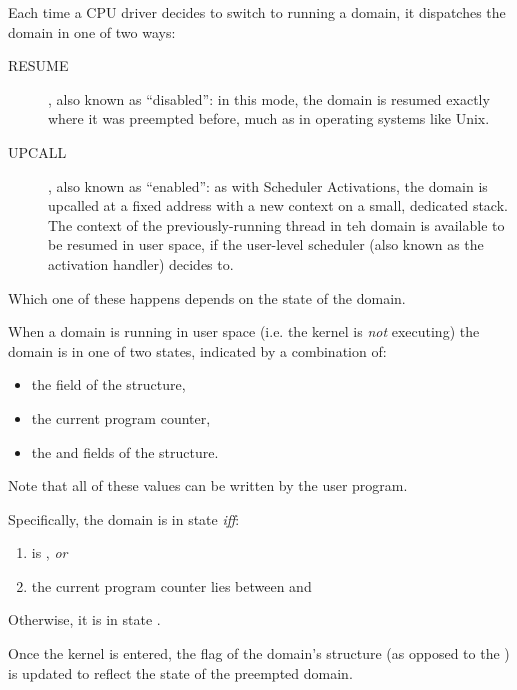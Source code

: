 \documentclass[a4paper,twoside]{report} %
\begin{document}
Each time a CPU driver decides to switch to running a domain, it
dispatches the domain in one of two ways:

\begin{description}
\item[RESUME], also known as ``disabled'': in this mode, the domain is
  resumed exactly where it was preempted before, much as in operating
  systems like Unix. 
\item[UPCALL], also known as ``enabled'': as with Scheduler
  Activations, the domain is upcalled at a fixed address with a new
  context on a small, dedicated stack.  The context of the
  previously-running thread in teh domain is available to be resumed
  in user space, if the user-level scheduler (also known as the
  activation handler) decides to. 
\end{description}

Which one of these happens depends on the state of the domain.  

When a domain is running in user space (i.e. the kernel is \emph{not}
executing) the domain is in one of two states, indicated by a
combination of:
\begin{itemize}
\item the  field of the  structure,
\item the current program counter,
\item the  and  fields of the  structure.
\end{itemize}

Note that all of these values can be written by the user program. 

Specifically, the domain is in  state \emph{iff}:
\begin{enumerate}
\item {} is , \emph{or}
\item the current program counter lies between  and
\end{enumerate}

Otherwise, it is in state .  

Once the kernel is entered, the  flag of the domain's
 structure (as opposed to the ) is updated to reflect the state of the
preempted domain. 


\end{document}
